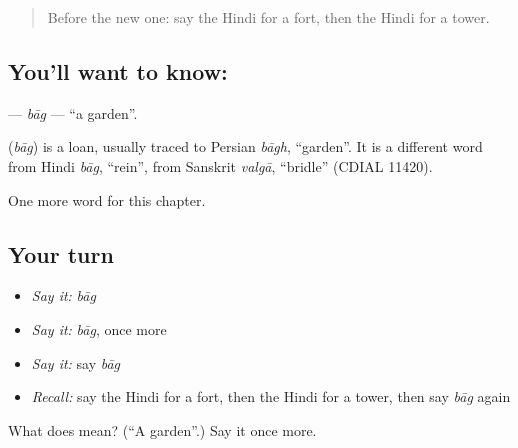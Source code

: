 \label{lesson:HI-C202-bag}



\begin{quote}
Before the new one: say the Hindi for a fort, then the Hindi for a tower.
\end{quote}

\subsection*{You'll want to know: }
\textbf{} — \emph{bāg} — \textquotedblleft{}a garden\textquotedblright{}.

\begin{cousinweb}
\textbf{} (\emph{bāg}) is a loan, usually traced to Persian \emph{bāgh}, \textquotedblleft{}garden\textquotedblright{}. It is a different word from Hindi \emph{bāg}, \textquotedblleft{}rein\textquotedblright{}, from Sanskrit \emph{valgā}, \textquotedblleft{}bridle\textquotedblright{} (CDIAL 11420).
\end{cousinweb}

\begin{grammarlens}[title={What you've built}]
One more word for this chapter.
\end{grammarlens}

\subsection*{Your turn}
\begin{itemize}
\raggedright
  \item \emph{Say it:} \emph{bāg}
  \item \emph{Say it:} \emph{bāg}, once more
  \item \emph{Say it:} say \emph{bāg}
  \item \emph{Recall:} say the Hindi for a fort, then the Hindi for a tower, then say \emph{bāg} again
\end{itemize}

\begin{tcolorbox}[breakable,colback=teal!4,colframe=teal!35!black,title={Before you move on}]
What does  mean? (\textquotedblleft{}A garden\textquotedblright{}.) Say it once more.
\end{tcolorbox}
